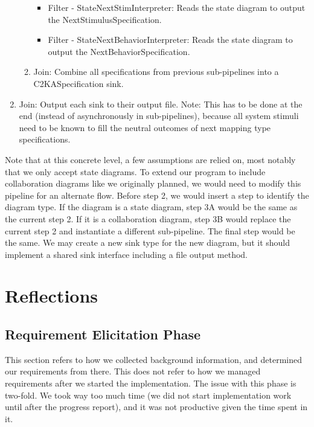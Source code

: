 \documentclass[11pt]{article}
\begin{document}
\begin{enumerate}
\begin{enumerate}
\begin{itemize}
                \item Filter - StateNextStimInterpreter: Reads the state diagram to output the NextStimulusSpecification.
                \item Filter - StateNextBehaviorInterpreter: Reads the state diagram to output the NextBehaviorSpecification.
            \end{itemize}
            \item Join: Combine all specifications from previous sub-pipelines into a C2KASpecification sink.
        \end{enumerate}
        \item Join: Output each sink to their output file.
        Note: This has to be done at the end (instead of asynchronously in sub-pipelines),
        because all system stimuli need to be known to fill the neutral outcomes of next mapping type specifications.
    \end{enumerate}

    Note that at this concrete level, a few assumptions are relied on, most notably that we only accept state diagrams.
    To extend our program to include collaboration diagrams like we originally planned,
    we would need to modify this pipeline for an alternate flow.
    Before step 2, we would insert a step to identify the diagram type.
    If the diagram is a state diagram, step 3A would be the same as the current step 2.
    If it is a collaboration diagram, step 3B would replace the current step 2 and instantiate a different sub-pipeline.
    The final step would be the same.
    We may create a new sink type for the new diagram,
    but it should implement a shared sink interface including a file output method.

    \section{Reflections}
    \subsection{Requirement Elicitation Phase}
    This section refers to how we collected background information, and determined our requirements from there.
    This does not refer to how we managed requirements after we started the implementation.
    The issue with this phase is two-fold.
    We took way too much time (we did not start implementation work until after the progress report),
    and it was not productive given the time spent in it.\\
\end{document}
